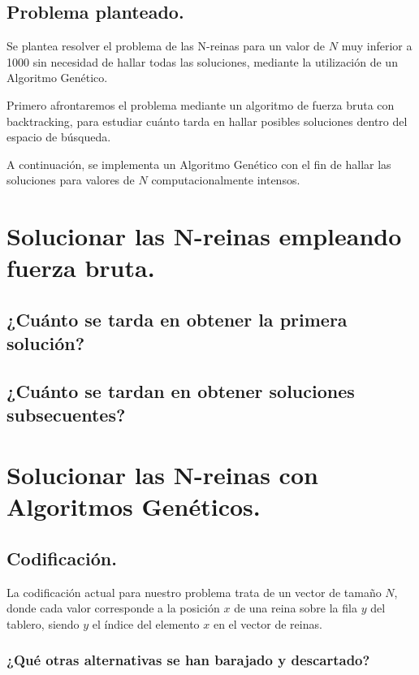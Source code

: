 \documentclass[12pt]{article}
\begin{document}
\subsection{Problema planteado.}
Se plantea resolver el problema de las N-reinas para un valor de $N$ muy inferior a 1000 sin necesidad de hallar todas las soluciones, mediante la utilización de un Algoritmo Genético.

Primero afrontaremos el problema mediante un algoritmo de fuerza bruta con backtracking, para estudiar cuánto tarda en hallar posibles soluciones dentro del espacio de búsqueda.

A continuación, se implementa un Algoritmo Genético con el fin de hallar las soluciones para valores de $N$ computacionalmente intensos.

\section{Solucionar las N-reinas empleando fuerza bruta.}

\subsection{¿Cuánto se tarda en obtener la primera solución?}

\subsection{¿Cuánto se tardan en obtener soluciones subsecuentes?}

\section{Solucionar las N-reinas con Algoritmos Genéticos.}

\subsection{Codificación.}

La codificación actual para nuestro problema trata de un vector de tamaño $N$, donde cada valor corresponde a la posición $x$ de una reina sobre la fila $y$ del tablero, siendo $y$ el índice del elemento $x$ en el vector de reinas.

\subsubsection{¿Qué otras alternativas se han barajado y descartado?}
\end{document}
